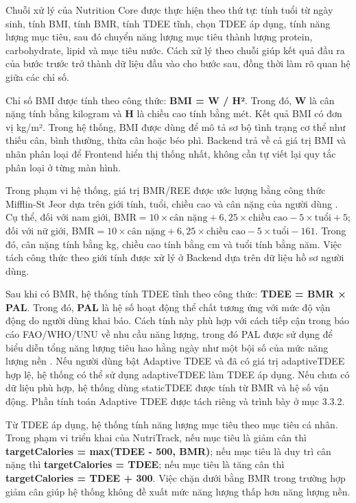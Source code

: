 \documentclass[12pt, a4paper]{report}
\begin{document}
Chuỗi xử lý của Nutrition Core được thực hiện theo thứ tự: tính tuổi từ ngày sinh, tính BMI, tính BMR, tính TDEE tĩnh, chọn TDEE áp dụng, tính năng lượng mục tiêu, sau đó chuyển năng lượng mục tiêu thành lượng protein, carbohydrate, lipid và mục tiêu nước. Cách xử lý theo chuỗi giúp kết quả đầu ra của bước trước trở thành dữ liệu đầu vào cho bước sau, đồng thời làm rõ quan hệ giữa các chỉ số.

Chỉ số BMI được tính theo công thức: \textbf{BMI = W / H²}. Trong đó, \textbf{W} là cân nặng tính bằng kilogram và \textbf{H} là chiều cao tính bằng mét. Kết quả BMI có đơn vị kg/m². Trong hệ thống, BMI được dùng để mô tả sơ bộ tình trạng cơ thể như thiếu cân, bình thường, thừa cân hoặc béo phì. Backend trả về cả giá trị BMI và nhãn phân loại để Frontend hiển thị thống nhất, không cần tự viết lại quy tắc phân loại ở từng màn hình.

Trong phạm vi hệ thống, giá trị BMR/REE được ước lượng bằng công thức Mifflin-St Jeor dựa trên giới tính, tuổi, chiều cao và cân nặng của người dùng \cite{mifflin1990}. Cụ thể, đối với nam giới, $\text{BMR} = 10 \times \text{cân nặng} + 6,25 \times \text{chiều cao} - 5 \times \text{tuổi} + 5$; đối với nữ giới, $\text{BMR} = 10 \times \text{cân nặng} + 6,25 \times \text{chiều cao} - 5 \times \text{tuổi} - 161$. Trong đó, cân nặng tính bằng kg, chiều cao tính bằng cm và tuổi tính bằng năm. Việc tách công thức theo giới tính được xử lý ở Backend dựa trên dữ liệu hồ sơ người dùng.

Sau khi có BMR, hệ thống tính TDEE tĩnh theo công thức: \textbf{TDEE = BMR × PAL}. Trong đó, \textbf{PAL} là hệ số hoạt động thể chất tương ứng với mức độ vận động do người dùng khai báo. Cách tính này phù hợp với cách tiếp cận trong báo cáo FAO/WHO/UNU về nhu cầu năng lượng, trong đó PAL được sử dụng để biểu diễn tổng năng lượng tiêu hao hằng ngày như một bội số của mức năng lượng nền \cite{fao_who_unu_2001}. Nếu người dùng bật Adaptive TDEE và đã có giá trị adaptiveTDEE hợp lệ, hệ thống có thể sử dụng adaptiveTDEE làm TDEE áp dụng. Nếu chưa có dữ liệu phù hợp, hệ thống dùng staticTDEE được tính từ BMR và hệ số vận động. Phần tính toán Adaptive TDEE được tách riêng và trình bày ở mục 3.3.2.

Từ TDEE áp dụng, hệ thống tính năng lượng mục tiêu theo mục tiêu cá nhân. Trong phạm vi triển khai của NutriTrack, nếu mục tiêu là giảm cân thì \textbf{targetCalories = max(TDEE - 500, BMR)}; nếu mục tiêu là duy trì cân nặng thì \textbf{targetCalories = TDEE}; nếu mục tiêu là tăng cân thì \textbf{targetCalories = TDEE + 300}. Việc chặn dưới bằng BMR trong trường hợp giảm cân giúp hệ thống không đề xuất mức năng lượng thấp hơn năng lượng nền.
\end{document}
